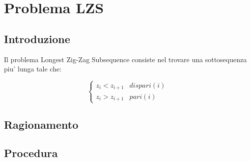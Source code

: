 \chapter{Problema LZS}

\section{Introduzione}

Il problema Longest Zig-Zag Subsequence consiste nel trovare una sottosequenza piu' lunga tale che:

\[
    \begin{cases}
        \text{$z_i < z_{i+1}$} & \text{$dispari(i)$} \\
        \text{$z_i > z_{i+1}$} & \text{$pari(i)$}
    \end{cases}
\]

\section{Ragionamento}

\section{Procedura}
